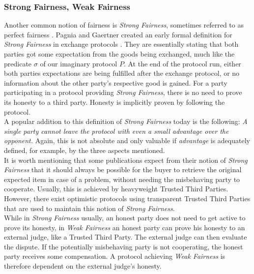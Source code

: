 \documentclass{cacthesis}
\begin{document}
        \subsubsection{Strong Fairness, Weak Fairness}
        Another common notion of fairness is \textit{Strong Fairness}, sometimes referred to as perfect fairness \cite{DELGADOSEGURA2020832}. Pagnia and Gaertner created an early formal definition for \textit{Strong Fairness} in exchange protocols \cite{Pagnia99onthe}. They are essentially stating that both parties got some expectation from the goods being exchanged, much like the predicate $\sigma$ of our imaginary protocol $P$. At the end of the protocol run, either both parties expectations are being fulfilled after the exchange protocol, or no information about the other party's respective good is gained. For a party participating in a protocol providing \textit{Strong Fairness}, there is no need to prove its honesty to a third party. Honesty is implicitly proven by following the protocol. \\
        A popular addition to this definition of \textit{Strong Fairness} today is the following: \textit{A single party cannot leave the protocol with even a small advantage over the opponent.} Again, this is not absolute and only valuable if \textit{advantage} is adequately defined, for example, by the three aspects mentioned. \\
        It is worth mentioning that some publications expect from their notion of \textit{Strong Fairness} that it should always be possible for the buyer to retrieve the original expected item in case of a problem, without needing the misbehaving party to cooperate. Usually, this is achieved by heavyweight Trusted Third Parties. However, there exist optimistic protocols using transparent Trusted Third Parties \cite{10.1145/3243734.3243857} \cite{6982058} that are used to maintain this notion of \textit{Strong Fairness}. \\
        While in \textit{Strong Fairness} usually, an honest party does not need to get active to prove its honesty, in \textit{Weak Fairness} an honest party can prove his honesty to an external judge, like a Trusted Third Party. The external judge can then evaluate the dispute. If the potentially misbehaving party is not cooperating, the honest party receives some compensation. A protocol achieving \textit{Weak Fairness} is therefore dependent on the external judge's honesty.
        
\end{document}
